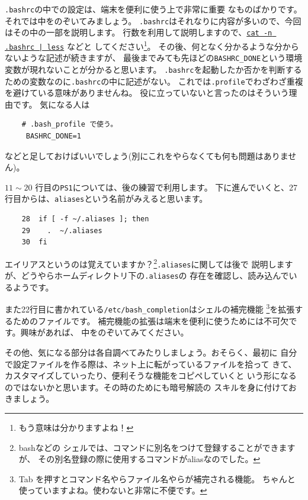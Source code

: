 \documentclass[a4j]{ltjreport}
\begin{document}
    \vspace*{3mm}

    \verb+.bashrc+の中での設定は、端末を便利に使う上で非常に重要
    なものばかりです。それでは中をのぞいてみましょう。
    \verb+.bashrc+はそれなりに内容が多いので、今回はその中の一部を説明します。
    行数を利用して説明しますので、\underline{\texttt{cat -n .bashrc | less}} などと
    してください\footnote{もう意味は分かりますよね！}。
    その後、何となく分かるような分からないような記述が続きますが、
    最後までみても先ほどの\verb+BASHRC_DONE+という環境変数が現れないことが分かると思います。
    \verb+.bashrc+を起動したか否かを判断するための変数なのに\verb+.bashrc+の中に記述がない。
    これでは\verb+.profile+でわざわざ重複を避けている意味がありませんね。
    役に立っていないと言ったのはそういう理由です。
    気になる人は
    \begin{verbatim}
    # .bash_profile で使う。
     BASHRC_DONE=1
    \end{verbatim}
    などと足しておけばいいでしょう(別にこれをやらなくても何も問題はありません)。

    $11 \sim 20$ 行目の\verb+PS1+については、後の練習で利用します。
    下に進んでいくと、27 行目からは、\verb+aliases+という名前がみえると思います。
    \begin{verbatim}
    28  if [ -f ~/.aliases ]; then
    29    .  ~/.aliases
    30  fi
    \end{verbatim}
    エイリアスというのは覚えていますか？\footnote{bashなどの
    シェルでは、コマンドに別名をつけて登録することができますが、
    その別名登録の際に使用するコマンドがaliasなのでした。}\verb+.aliases+に関しては後で
    説明しますが、どうやらホームディレクトリ下の\verb+.aliases+の
    存在を確認し、読み込んでいるようです。

    また22行目に書かれている\verb+/etc/bash_completion+はシェルの補完機能
    \footnote{Tab を押すとコマンド名やらファイル名やらが補完される機能。
    ちゃんと使っていますよね。使わないと非常に不便です。}を拡張するためのファイルです。
    補完機能の拡張は端末を便利に使うためには不可欠です。興味があれば、
    中をのぞいてみてください。

    その他、気になる部分は各自調べてみたりしましょう。おそらく、最初に
    自分で設定ファイルを作る際は、ネット上に転がっているファイルを拾って
    きて、カスタマイズしていったり、便利そうな機能をコピペしていくと
    いう形になるのではないかと思います。その時のためにも暗号解読の
    スキルを身に付けておきましょう。
\end{document}
